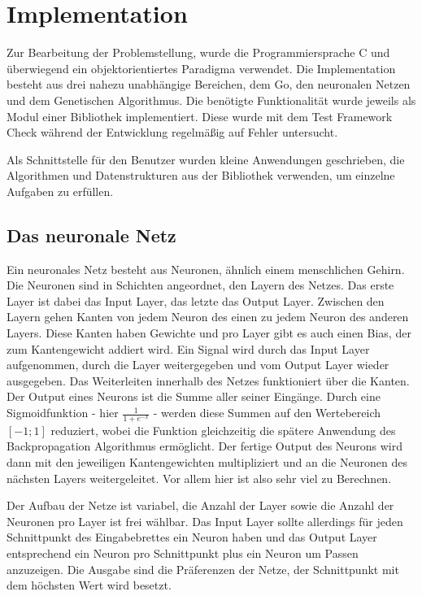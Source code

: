 \section{Implementation}

Zur Bearbeitung der Problemstellung, wurde die Programmiersprache C und
überwiegend ein objektorientiertes Paradigma verwendet.  Die Implementation
besteht aus drei nahezu unabhängige Bereichen, dem Go, den neuronalen Netzen
und dem Genetischen Algorithmus. Die benötigte Funktionalität wurde jeweils als
Modul einer Bibliothek implementiert.  Diese wurde mit dem Test Framework Check
\cite{check} während der Entwicklung regelmäßig auf Fehler untersucht.

Als Schnittstelle für den Benutzer wurden kleine Anwendungen geschrieben, die
Algorithmen und Datenstrukturen aus der Bibliothek verwenden, um einzelne
Aufgaben zu erfüllen.


\subsection{Das neuronale Netz}

Ein neuronales Netz besteht aus Neuronen, ähnlich einem menschlichen Gehirn. Die
Neuronen sind in Schichten angeordnet, den Layern des Netzes. Das erste Layer
ist dabei das Input Layer, das letzte das Output Layer. Zwischen den Layern
gehen Kanten von jedem Neuron des einen zu jedem Neuron des anderen Layers.
Diese Kanten haben Gewichte und pro Layer gibt es auch einen Bias, der zum
Kantengewicht addiert wird. Ein Signal wird durch das Input Layer aufgenommen,
durch die Layer weitergegeben und vom Output Layer wieder ausgegeben. Das
Weiterleiten innerhalb des Netzes funktioniert über die Kanten. Der Output eines
Neurons ist die Summe aller seiner Eingänge. Durch eine Sigmoidfunktion - hier
$\frac{1}{1 + e^{-x}}$ - werden diese Summen auf den Wertebereich $[-1;1]$
reduziert, wobei die Funktion gleichzeitig die spätere Anwendung des
Backpropagation Algorithmus ermöglicht. Der fertige Output des
Neurons wird dann mit den jeweiligen Kantengewichten multipliziert und an die
Neuronen des nächsten Layers weitergeleitet. Vor allem hier ist also sehr viel
zu Berechnen. 

Der Aufbau der Netze ist variabel, die Anzahl der Layer sowie die Anzahl der
Neuronen pro Layer ist frei wählbar. Das Input Layer sollte allerdings für jeden
Schnittpunkt des Eingabebrettes ein Neuron haben und das Output Layer
entsprechend ein Neuron pro Schnittpunkt plus ein Neuron um Passen anzuzeigen.
Die Ausgabe sind die Präferenzen der Netze, der Schnittpunkt mit dem höchsten
Wert wird besetzt. 


